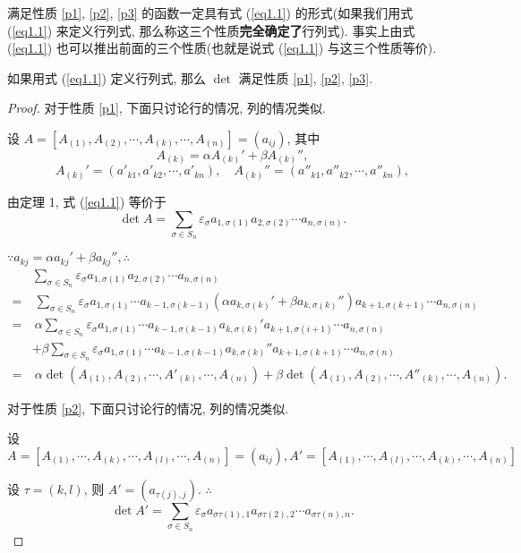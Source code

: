 \documentclass[color=black,device=normal,lang=cn,mode=geye]{elegantnote}
\begin{document}
满足性质 \ref{p1}, \ref{p2}, \ref{p3} 的函数一定具有式 (\ref{eq1.1}) 的形式(如果我们用式 (\ref{eq1.1}) 来定义行列式, 那么称这三个性质\textbf{完全确定了}行列式). 事实上由式 (\ref{eq1.1}) 也可以推出前面的三个性质(也就是说式 (\ref{eq1.1}) 与这三个性质等价).
\begin{theorem}
    如果用式 (\ref{eq1.1}) 定义行列式, 那么 $\det$ 满足性质 \ref{p1}, \ref{p2}, \ref{p3}.
\end{theorem}
\begin{proof}
    对于性质 \ref{p1}, 下面只讨论行的情况, 列的情况类似.

    设 $A=[A_{(1)},A_{(2)},\cdots,A_{(k)},\cdots,A_{(n)}]=(a_{ij})$, 其中
    \[A_{(k)}=\alpha A_{(k)}'+\beta A_{(k)}'',\]
    \[A_{(k)}'=(a'_{k1},a'_{k2},\cdots,a'_{kn}),\quad A_{(k)}''=(a''_{k1},a''_{k2},\cdots,a''_{kn}),\]

    由定理 1, 式 (\ref{eq1.1}) 等价于
    \[\det A=\sum\limits_{\sigma\in S_n}\varepsilon_\sigma a_{1,\sigma(1)}a_{2,\sigma(2)}\cdots a_{n,\sigma(n)}.\]

    $\because a_{kj}=\alpha a_{kj}'+\beta a_{kj}'',\therefore$
    \begin{align*}
        & \sum\limits_{\sigma\in S_n}\varepsilon_\sigma a_{1,\sigma(1)}a_{2,\sigma(2)}\cdots a_{n,\sigma(n)} \\
        = & \ \sum\limits_{\sigma\in S_n}\varepsilon_\sigma a_{1,\sigma(1)}\cdots a_{k-1,\sigma(k-1)}(\alpha a_{k,\sigma(k)}'+\beta a_{k,\sigma(k)}'')a_{k+1,\sigma(k+1)}\cdots a_{n,\sigma(n)} \\
        = & \ \alpha\sum\limits_{\sigma\in S_n}\varepsilon_\sigma a_{1,\sigma(1)}\cdots a_{k-1,\sigma(k-1)}a_{k,\sigma(k)}'a_{k+1,\sigma(i+1)}\cdots a_{n,\sigma(n)} \\
        & +\beta\sum\limits_{\sigma\in S_n}\varepsilon_\sigma a_{1,\sigma(1)}\cdots a_{k-1,\sigma(k-1)}a_{k,\sigma(k)}''a_{k+1,\sigma(k+1)}\cdots a_{n,\sigma(n)} \\
        = & \ \alpha\det(A_{(1)},A_{(2)},\cdots,A'_{(k)},\cdots,A_{(n)})+\beta\det(A_{(1)},A_{(2)},\cdots,A''_{(k)},\cdots,A_{(n)}).
    \end{align*}

    对于性质 \ref{p2}, 下面只讨论行的情况, 列的情况类似.

    设
    \[A=[A_{(1)},\cdots,A_{(k)},\cdots,A_{(l)},\cdots,A_{(n)}]=(a_{ij}),A'=[A_{(1)},\cdots,A_{(l)},\cdots,A_{(k)},\cdots,A_{(n)}]\]

    设 $\tau=(k,l)$, 则 $A'=(a_{\tau(j),j})$. $\therefore$
    \[\det A'=\sum\limits_{\sigma\in S_n}\varepsilon_\sigma a_{\sigma\tau(1),1}a_{\sigma\tau(2),2}\cdots a_{\sigma\tau(n),n}.\]


\end{proof}
\end{document}
